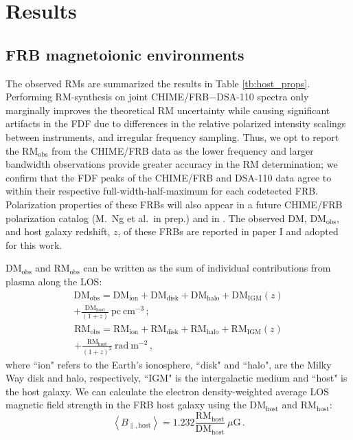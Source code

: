 \documentclass[twocolumn, linenumbers]{aastex701}
\newcommand{\newchange}[1]{{\color{red}\textbf{#1}}}
\begin{document}
\section{Results} \label{sec:results}
\subsection{FRB magnetoionic environments} \label{sec:results_host_env}
The observed RMs are summarized the results in Table \ref{tb:host_props}. Performing RM-synthesis on joint CHIME/FRB$-$DSA-110 spectra only marginally improves the theoretical RM uncertainty while causing significant artifacts in the FDF due to differences in the relative polarized intensity scalings between instruments, and irregular frequency sampling. Thus, we opt to report the $\mathrm{RM}_\mathrm{obs}$ from the CHIME/FRB data as the lower frequency and larger bandwidth observations provide greater accuracy in the RM determination; we confirm that the FDF peaks of the CHIME/FRB and DSA-110 data agree to within their respective full-width-half-maximum for each codetected FRB. Polarization properties of these FRBs will also appear in a future CHIME/FRB polarization catalog (M.~Ng et al.~in prep.) and in \newchange{\citet{2024ApJ...964..131S}}. The observed DM, $\mathrm{DM}_\mathrm{obs}$, and host galaxy redshift, $z$, of these FRBs are reported in paper I and adopted for this work. 

$\mathrm{DM}_\mathrm{obs}$ and $\mathrm{RM}_\mathrm{obs}$ can be written as the sum of individual contributions from plasma along the LOS:
\begin{multline}
\mathrm{DM}_\mathrm{obs} = \mathrm{DM}_{\mathrm{ion}} + \mathrm{DM}_{\mathrm{disk}} + \mathrm{DM}_{\mathrm{halo}} + \mathrm{DM}_{\mathrm{IGM}}(z) \\
+ \frac{\mathrm{DM}_{\mathrm{host}}}{(1 + z)}~\mathrm{pc}~\mathrm{cm}^{-3}\,; \label{eq:dm_comps}
\end{multline}
\begin{multline}
\mathrm{RM}_\mathrm{obs} = \mathrm{RM}_{\mathrm{ion}} + \mathrm{RM}_{\mathrm{disk}} + \mathrm{RM}_{\mathrm{halo}} + \mathrm{RM}_{\mathrm{IGM}}(z) \\
+ \frac{\mathrm{RM}_{\mathrm{host}}}{(1+z)^2}~\mathrm{rad}~\mathrm{m}^{-2}\,, \label{eq:rm_comps}
\end{multline}
where ``ion" refers to the Earth's ionosphere, ``disk" and ``halo", are the Milky Way disk and halo, respectively, ``IGM" is the intergalactic medium and ``host" is the host galaxy. We can calculate the electron density-weighted average LOS magnetic field strength in the FRB host galaxy using the $\mathrm{DM}_{\mathrm{host}}$ and $\mathrm{RM}_{\mathrm{host}}$:
\begin{equation}
\left<B_{\parallel,\mathrm{host}}\right> = 1.232 \frac{\mathrm{RM}_\mathrm{host}}{\mathrm{DM}_\mathrm{host}}~\mu\text{G}\,. \label{eq:b_host}
\end{equation}
\end{document}
